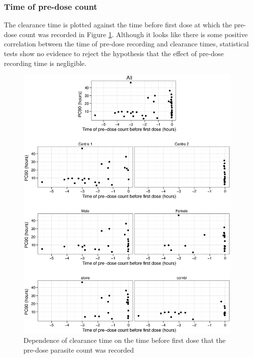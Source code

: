 \subsubsection*{Time of pre-dose count}
The clearance time is plotted against the time before first dose at which the pre-dose count was recorded in Figure \ref{pretime-ancova}. Although it looks like there is some positive correlation between the time of pre-dose recording and clearance times, statistical tests show no evidence to reject the hypothesis that the effect of pre-dose recording time is negligible.
\begin{figure}[p]
\includegraphics[width=6.5in]{pretime-ancova.eps} 
\caption{Dependence of clearance time on the time before first dose that the pre-dose parasite count was recorded}
\label{pretime-ancova}
\end{figure}


